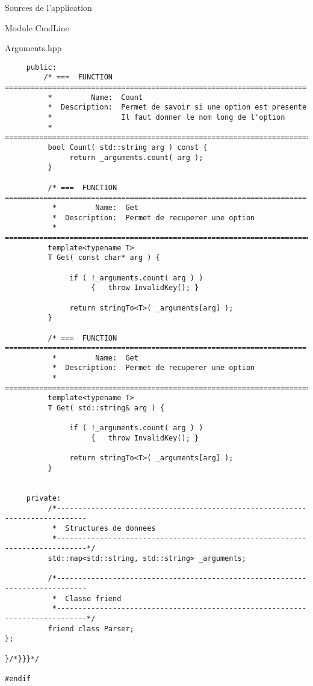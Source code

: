 \documentclass{article}
\begin{document}
\begin{section}{Sources de l'application}
\begin{subsection}{Module CmdLine}
\begin{paragraph}{Arguments.hpp}
\begin{verbatim}
     public:
         /* ===  FUNCTION  ======================================================================
          *         Name:  Count
          *  Description:  Permet de savoir si une option est presente
          *                Il faut donner le nom long de l'option
          * =====================================================================================*/
          bool Count( std::string arg ) const {
               return _arguments.count( arg );
          }

          /* ===  FUNCTION  ======================================================================
           *         Name:  Get
           *  Description:  Permet de recuperer une option 
           * =====================================================================================*/
          template<typename T>
          T Get( const char* arg ) {

               if ( !_arguments.count( arg ) )
                    {   throw InvalidKey(); }

               return stringTo<T>( _arguments[arg] );
          }

          /* ===  FUNCTION  ======================================================================
           *         Name:  Get
           *  Description:  Permet de recuperer une option 
           * =====================================================================================*/
          template<typename T>
          T Get( std::string& arg ) {

               if ( !_arguments.count( arg ) )
                    {   throw InvalidKey(); }

               return stringTo<T>( _arguments[arg] );
          }


     private:
          /*-----------------------------------------------------------------------------
           *  Structures de donnees
           *-----------------------------------------------------------------------------*/
          std::map<std::string, std::string> _arguments;

          /*-----------------------------------------------------------------------------
           *  Classe friend
           *-----------------------------------------------------------------------------*/
          friend class Parser;
};

}/*}}}*/

#endif

  \end{verbatim}
  \end{paragraph}


\end{subsection}
\end{section}
\end{document}
